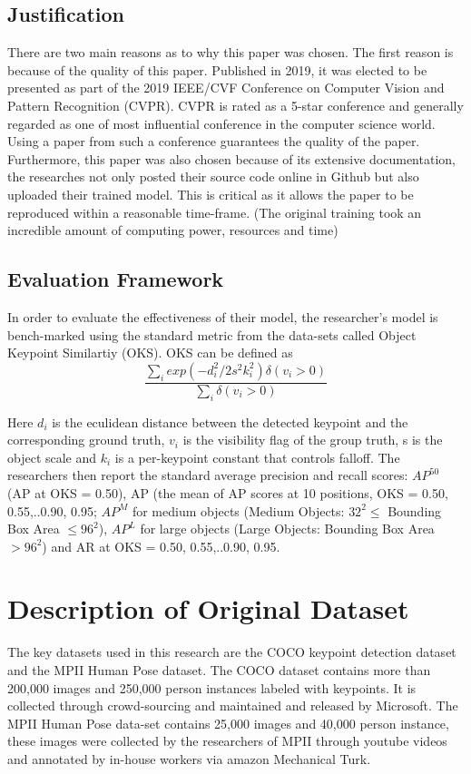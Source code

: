 \documentclass[a4paper,12pt]{article}
\begin{document}
\subsection{Justification}

There are two main reasons as to why this paper was chosen. The first reason is because of the quality of this paper. Published in 2019, it was elected to be presented as part of the 2019 IEEE/CVF Conference on Computer Vision and Pattern Recognition (CVPR). CVPR is rated as a 5-star conference and generally regarded as one of most influential conference in the computer science world. Using a paper from such a conference guarantees the quality of the paper. Furthermore, this paper was also chosen because of its extensive documentation, the researches not only posted their source code online in Github but also uploaded their trained model. This is critical as it allows the paper to be reproduced within a reasonable time-frame. (The original training took an incredible amount of computing power, resources and time)  


\subsection{Evaluation Framework}

In order to evaluate the effectiveness of their model, the researcher's model is bench-marked using the standard metric from the data-sets called Object Keypoint Similartiy (OKS).  OKS can be defined as 
 \[ \frac{\sum_{i}exp(-d_i^2/2s^2k_i^2)\delta(v_i>0)}{\sum_{i}\delta(v_i>0)} \] 

Here $d_i$ is the eculidean distance between the detected keypoint and the corresponding ground truth, $v_i$ is the visibility flag of the group truth, s is the object scale and $k_i$ is a per-keypoint constant that controls falloff. The researchers then report the standard average precision and recall scores: $AP^{50}$ (AP at OKS = 0.50), AP (the mean of AP scores at 10 positions, OKS = 0.50, 0.55,..0.90, 0.95; $AP^M$ for medium objects (Medium Objects: $32^2 \le$ Bounding Box Area $\le 96^2$), $AP^L$ for large objects (Large Objects: Bounding Box Area $> 96^2$) and AR at OKS = 0.50, 0.55,..0.90, 0.95.

\section{Description of Original Dataset}

The key datasets used in this research are the COCO keypoint detection dataset and the MPII Human Pose dataset. The COCO dataset contains more than 200,000 images and 250,000 person instances labeled with keypoints. It is collected through crowd-sourcing and maintained and released by Microsoft. The MPII Human Pose data-set contains 25,000 images and 40,000 person instance, these images were collected by the researchers of MPII through youtube videos and annotated by in-house workers via amazon Mechanical Turk. 
\end{document}
